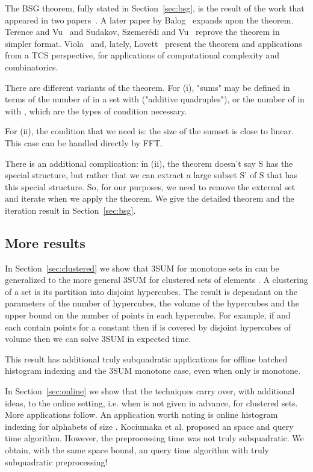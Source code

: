 \documentclass[11pt]{article}
\begin{document}
{The BSG theorem, fully stated in Section~\ref{sec:bsg}, is the result of the work that appeared in two papers~\cite{BS94,Gowers01}. A later paper by Balog~\cite{Balog07} expands upon the theorem. Terence and Vu~\cite{TV06} and Sudakov, Szemer\'{e}di and Vu~\cite{SSV94} reprove the theorem in simpler format. Viola~\cite{Viola11} and, lately, Lovett~\cite{Lovett14} present the theorem and applications from a TCS perspective, for applications of computational complexity and combinatorics.


There are different variants of the theorem.
For (i), "sums" may be defined in terms of the number of 
in a set  with  ("additive quadruples"), or the number of 
in  with , which are the types of condition necessary.

For (ii), the
condition that we need is: the size of the sumset  is close to linear.
This case can be handled directly by FFT.

There is an additional complication: in (ii), the theorem doesn't
say S has the special structure, but rather that we can extract a large
subset S' of S that has this special structure.  So, for our
purposes, we need to remove the external set and iterate when we apply the theorem. We give the detailed theorem and the iteration result in Section~\ref{sec:bsg}.




\subsection{More results}

In Section~\ref{sec:clustered} we show that 3SUM for monotone sets in  can be generalized to the more general 3SUM for clustered sets of elements . A clustering of a set is its partition into disjoint hypercubes. The result is dependant on the parameters of the number of hypercubes, the volume of the hypercubes and the upper bound on the number of points in each hypercube. For example, if  and  each contain  points  for a constant  then if  is covered by  disjoint hypercubes of volume  then we can solve 3SUM in  expected time.

This result has additional truly subquadratic applications for offline batched histogram indexing and the 3SUM monotone case, even when only  is monotone.

In Section~\ref{sec:online} we show that the techniques carry over, with additional ideas, to the online setting, i.e. when  is not given in advance, for clustered sets. More applications follow. An application worth noting is online histogram indexing for alphabets of size . Kociumaka et al. proposed an  space and  query time algorithm. However, the preprocessing time was not truly subquadratic. We obtain, with the same space bound, an  query time algorithm with truly subquadratic preprocessing!

}
\end{document}

